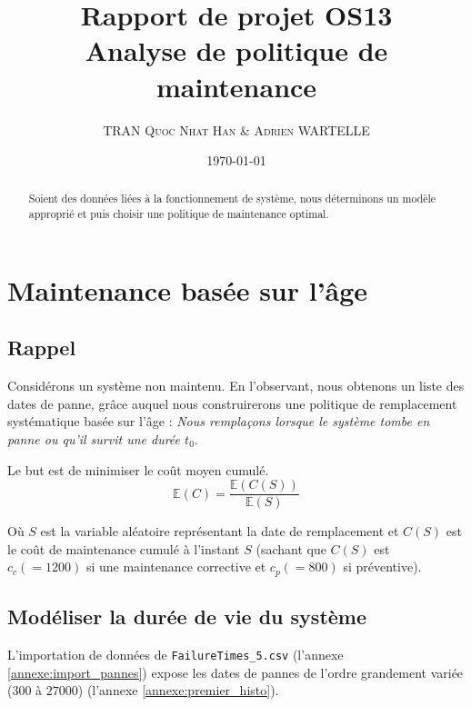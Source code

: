 \documentclass[10pt,a4paper]{article}
\author{\textsc{TRAN Quoc Nhat Han} \& \textsc{Adrien WARTELLE}}
\title{Rapport de projet OS13\\Analyse de politique de maintenance}
\date{\today}
\begin{document}
\maketitle
\renewcommand{\contentsname}{Sommaire}
\tableofcontents
\begin{abstract}
Soient des données liées à la fonctionnement de système, nous déterminons un modèle approprié et puis choisir une politique de maintenance optimal.
\end{abstract}
\section{Maintenance basée sur l'âge}
\subsection{Rappel}
Considérons un système non maintenu. En l'observant, nous obtenons un liste des dates de panne, grâce auquel nous construirerons une politique de remplacement systématique basée sur l'âge : \emph{Nous remplaçons lorsque le système tombe en panne ou qu'il survit une durée $t_0$}.

Le but est de minimiser le coût moyen cumulé.
\begin{equation}
    \label{coutmoyduree}
    \mathbb{E}(C) = \frac{\mathbb{E}(C(S))}{\mathbb{E}(S)}
\end{equation}

Où $S$ est la variable aléatoire représentant la date de remplacement et $C(S)$ est le coût de maintenance cumulé à l'instant $S$ (sachant que $C(S)$ est $c_c (=1200)$ si une maintenance corrective et $c_p(=800)$ si préventive).
\subsection{Modéliser la durée de vie du système}
L'importation de données de \texttt{FailureTimes\_5.csv} (l'annexe \ref{annexe:import_pannes}) expose les dates de pannes de l'ordre grandement variée ($300$ à $27000$) (l'annexe \ref{annexe:premier_histo}). 
\end{document}

